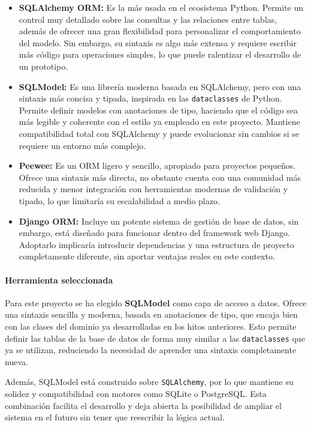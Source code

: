 \begin{itemize}
    \item \textbf{SQLAlchemy ORM:} Es la más usada en el ecosistema Python. Permite un control muy 
    detallado sobre las consultas y las relaciones entre tablas, además de ofrecer una gran flexibilidad para 
    personalizar el comportamiento del modelo. Sin embargo, su sintaxis es algo más extensa y requiere escribir 
    más código para operaciones simples, lo que puede ralentizar el desarrollo de un prototipo.

    \item \textbf{SQLModel:} Es una librería moderna basada en SQLAlchemy, pero con una sintaxis más concisa y 
    tipada, inspirada en las \texttt{dataclasses} de Python. Permite definir modelos con anotaciones de tipo, 
    haciendo que el código sea más legible y coherente con el estilo ya empleado en este proyecto. Mantiene 
    compatibilidad total con SQLAlchemy y puede evolucionar sin cambios si se requiere un entorno más complejo.

    \item \textbf{Peewee:} Es un ORM ligero y sencillo, apropiado para proyectos pequeños. Ofrece una sintaxis 
    más directa, no obstante cuenta con una comunidad más reducida y menor integración con herramientas modernas de 
    validación y tipado, lo que limitaría su escalabilidad a medio plazo.

    \item \textbf{Django ORM:} Incluye un potente sistema de gestión de base de datos, sin embargo, está diseñado para 
    funcionar dentro del framework web Django. Adoptarlo implicaría introducir dependencias y una estructura 
    de proyecto completamente diferente, sin aportar ventajas reales en este contexto.
\end{itemize}

\paragraph{Herramienta seleccionada}
Para este proyecto se ha elegido \textbf{SQLModel} como capa de acceso a datos.  
Ofrece una sintaxis sencilla y moderna, basada en anotaciones de tipo, que encaja bien con las clases del dominio 
ya desarrolladas en los hitos anteriores. Esto permite definir las tablas de la base de datos de forma muy similar 
a las \texttt{dataclasses} que ya se utilizan, reduciendo la necesidad de aprender una sintaxis completamente nueva.

Además, SQLModel está construido sobre \texttt{SQLAlchemy}, por lo que mantiene su solidez y compatibilidad con 
motores como SQLite o PostgreSQL. Esta combinación facilita el desarrollo y deja abierta la posibilidad de ampliar 
el sistema en el futuro sin tener que reescribir la lógica actual.

